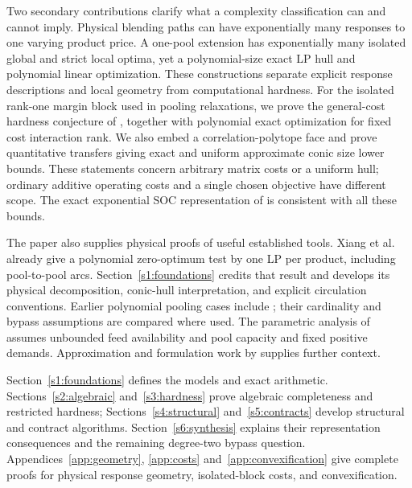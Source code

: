 Two secondary contributions clarify what a complexity classification
can and cannot imply. Physical blending paths can have exponentially
many responses to one varying product price. A one-pool extension has
exponentially many isolated global and strict local optima, yet a
polynomial-size exact LP hull and polynomial linear optimization.
These constructions separate explicit response descriptions and local
geometry from computational hardness. For the isolated rank-one margin
block used in pooling relaxations, we prove the general-cost hardness
conjecture of \citet{dey2020-convexifications-of-rank-one-based}, together
with polynomial exact optimization for fixed cost interaction rank.
We also embed a correlation-polytope face and prove quantitative
transfers giving exact and uniform approximate conic size lower bounds.
These statements concern arbitrary matrix costs or a uniform hull;
ordinary additive operating costs and a single chosen objective have
different scope. The exact exponential SOC representation of
\citet{s6:jalilian2026} is consistent with all these bounds.

The paper also supplies physical proofs of useful established tools.
Xiang et al.\ \cite{xiang2026-dive-and-fix} already give a polynomial
zero-optimum test by one LP per product, including pool-to-pool arcs.
Section~\ref{s1:foundations} credits that result and develops its
physical decomposition, conic-hull interpretation, and explicit
circulation conventions.
Earlier polynomial pooling cases include
\citet{s3:haugland-hendrix2016,s4:boland2017}; their cardinality and
bypass assumptions are compared where used. The parametric analysis of
\citet{s3:baltean2018} assumes unbounded feed availability and pool
capacity and fixed positive demands. Approximation and formulation work
by \citet{dey2015-analysis-of-milp-techniques-for,
gupte2017-relaxations-and-discretizations-for-the,
dey2020-convexifications-of-rank-one-based} supplies further context.

Section~\ref{s1:foundations} defines the models and exact arithmetic.
Sections~\ref{s2:algebraic} and~\ref{s3:hardness} prove algebraic
completeness and restricted hardness; Sections~\ref{s4:structural}
and~\ref{s5:contracts} develop structural and contract algorithms.
Section~\ref{s6:synthesis} explains their representation consequences
and the remaining degree-two bypass question. Appendices~\ref{app:geometry},
\ref{app:costs} and~\ref{app:convexification} give complete proofs for
physical response geometry, isolated-block costs, and convexification.

